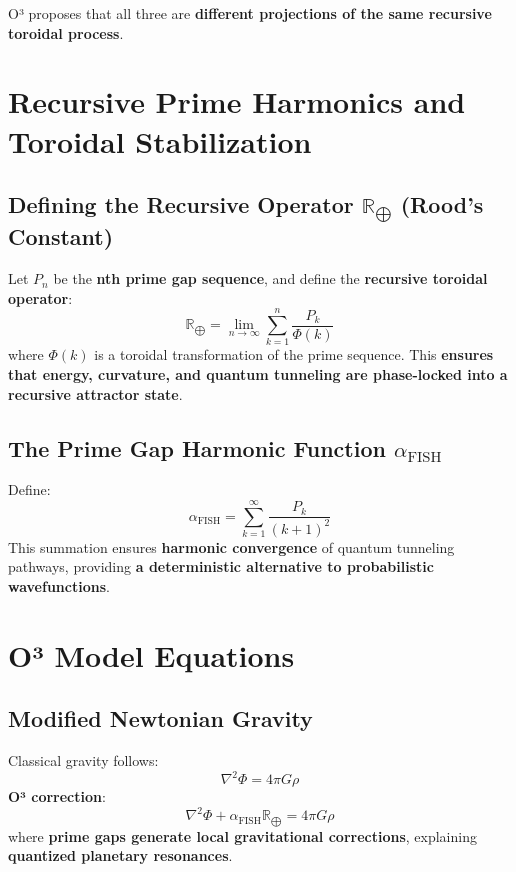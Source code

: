 \documentclass{article}
\begin{document}
O³ proposes that all three are \textbf{different projections of the same recursive toroidal process}.

\section{Recursive Prime Harmonics and Toroidal Stabilization}

\subsection{Defining the Recursive Operator \( \mathbb{R}_{\bigoplus} \) (Rood’s Constant)}
Let \( P_n \) be the \textbf{nth prime gap sequence}, and define the \textbf{recursive toroidal operator}:
\begin{equation}
\mathbb{R}_{\bigoplus} = \lim_{n \to \infty} \sum_{k=1}^{n} \frac{P_k}{\Phi(k)}
\end{equation}
where \( \Phi(k) \) is a toroidal transformation of the prime sequence. This \textbf{ensures that energy, curvature, and quantum tunneling are phase-locked into a recursive attractor state}.

\subsection{The Prime Gap Harmonic Function \( \alpha_{\text{FISH}} \)}
Define:
\begin{equation}
\alpha_{\text{FISH}} = \sum_{k=1}^{\infty} \frac{P_k}{(k+1)^2}
\end{equation}
This summation ensures \textbf{harmonic convergence} of quantum tunneling pathways, providing \textbf{a deterministic alternative to probabilistic wavefunctions}.

\section{O³ Model Equations}

\subsection{Modified Newtonian Gravity}
Classical gravity follows:
\begin{equation}
\nabla^2 \Phi = 4\pi G \rho
\end{equation}
\textbf{O³ correction}:
\begin{equation}
\nabla^2 \Phi + \alpha_{\text{FISH}} \mathbb{R}_{\bigoplus} = 4\pi G \rho
\end{equation}
where \textbf{prime gaps generate local gravitational corrections}, explaining \textbf{quantized planetary resonances}.
\end{document}
